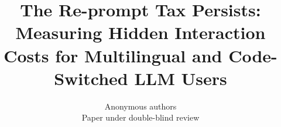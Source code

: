 \documentclass{article}
\title{The Re-prompt Tax Persists: Measuring Hidden Interaction Costs for Multilingual and Code-Switched LLM Users}
\author{Anonymous authors\\Paper under double-blind review}
\begin{document}
\raggedbottom

\ifcolmsubmission
\linenumbers
\fi

\maketitle














\end{document}

